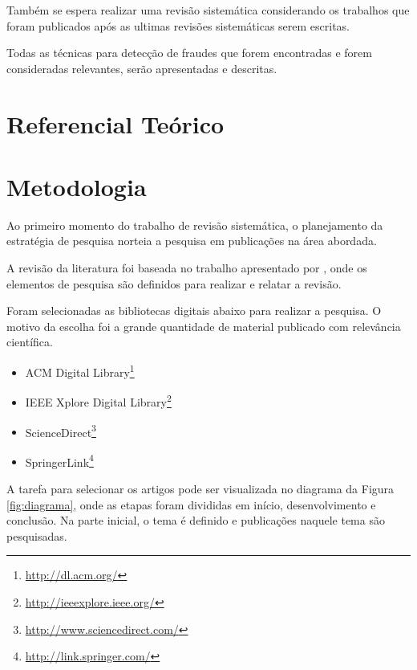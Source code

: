 \documentclass[smallextended]{svjour3}       %
\begin{document}
Também se espera realizar uma revisão sistemática considerando os trabalhos que foram publicados após as ultimas revisões sistemáticas serem escritas.

Todas as técnicas para detecção de fraudes que forem encontradas e forem consideradas relevantes, serão apresentadas e descritas.

\section{Referencial Teórico}
\label{sec:2}

\section{Metodologia}
\label{sec:3}

Ao primeiro momento do trabalho de revisão sistemática, o planejamento da estratégia de pesquisa norteia a pesquisa em publicações na área abordada.

A revisão da literatura foi baseada no trabalho apresentado por \cite{Kitchenham07guidelinesfor}, onde os elementos de pesquisa são definidos para realizar e relatar a revisão.

Foram selecionadas as bibliotecas digitais abaixo para realizar a pesquisa. O motivo da escolha foi a grande quantidade de material publicado com relevância científica.

\begin{itemize}
	\item \textsf{ACM Digital Library}\footnote{\url{http://dl.acm.org/}}
	
	\item \textsf{IEEE Xplore Digital Library}\footnote{\url{http://ieeexplore.ieee.org/}}
	
	\item \textsf{ScienceDirect}\footnote{\url{http://www.sciencedirect.com/}} 	
	
	\item \textsf{SpringerLink}\footnote{\url{http://link.springer.com/}}
\end{itemize}

A tarefa para selecionar os artigos pode ser visualizada no diagrama da Figura \ref{fig:diagrama}, onde as etapas foram divididas em início, desenvolvimento e conclusão. Na parte inicial, o tema é definido e publicações naquele tema são pesquisadas. 
\end{document}
